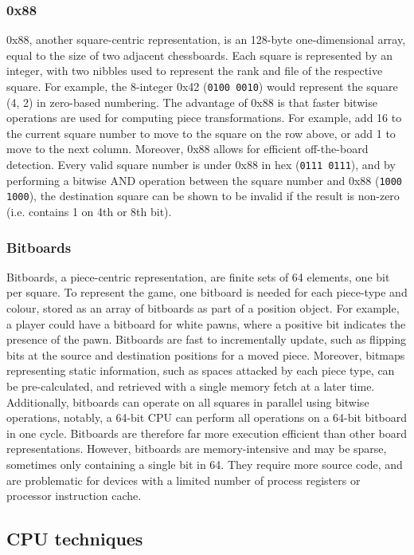 \documentclass[../main/main.tex]{subfiles}
\begin{document}
\subsubsection*{0x88}
0x88, another square\hyp{}centric representation, is an 128\hyp{}byte one\hyp{}dimensional array, equal to the size of two adjacent chessboards. Each square is represented by an integer, with two nibbles used to represent the rank and file of the respective square. For example, the 8\hyp{}integer 0x42 (\lstinline{0100 0010}) would represent the square (4, 2) in zero\hyp{}based numbering. The advantage of 0x88 is that faster bitwise operations are used for computing piece transformations. For example, add 16 to the current square number to move to the square on the row above, or add 1 to move to the next column. Moreover, 0x88 allows for efficient off\hyp{}the\hyp{}board detection. Every valid square number is under 0x88 in hex (\lstinline{0111 0111}), and by performing a bitwise AND operation between the square number and 0x88 (\lstinline{1000 1000}), the destination square can be shown to be invalid if the result is non\hyp{}zero (i.e. contains 1 on 4th or 8th bit).

\subsubsection*{Bitboards}
Bitboards, a piece-centric representation, are finite sets of 64 elements, one bit per square. To represent the game, one bitboard is needed for each piece-type and colour, stored as an array of bitboards as part of a position object. For example, a player could have a bitboard for white pawns, where a positive bit indicates the presence of the pawn. Bitboards are fast to incrementally update, such as flipping bits at the source and destination positions for a moved piece. Moreover, bitmaps representing static information, such as spaces attacked by each piece type, can be pre-calculated, and retrieved with a single memory fetch at a later time. Additionally, bitboards can operate on all squares in parallel using bitwise operations, notably, a 64-bit CPU can perform all operations on a 64-bit bitboard in one cycle. Bitboards are therefore far more execution efficient than other board representations. However, bitboards are memory-intensive and may be sparse, sometimes only containing a single bit in 64. They require more source code, and are problematic for devices with a limited number of process registers or processor instruction cache.

\subsection{CPU techniques}
\end{document}
